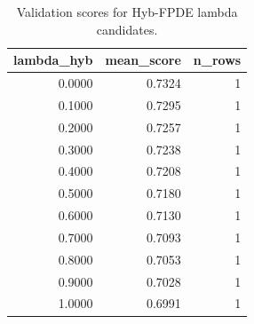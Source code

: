 \begin{table}[t]
\caption{Validation scores for Hyb-FPDE lambda candidates.}
\label{tab:lambda_distribution_computed}
\centering
\begin{tabular}{rrr}
\toprule
lambda\_hyb & mean\_score & n\_rows \\
\midrule
0.0000 & 0.7324 & 1 \\
0.1000 & 0.7295 & 1 \\
0.2000 & 0.7257 & 1 \\
0.3000 & 0.7238 & 1 \\
0.4000 & 0.7208 & 1 \\
0.5000 & 0.7180 & 1 \\
0.6000 & 0.7130 & 1 \\
0.7000 & 0.7093 & 1 \\
0.8000 & 0.7053 & 1 \\
0.9000 & 0.7028 & 1 \\
1.0000 & 0.6991 & 1 \\
\bottomrule
\end{tabular}

\end{table}
